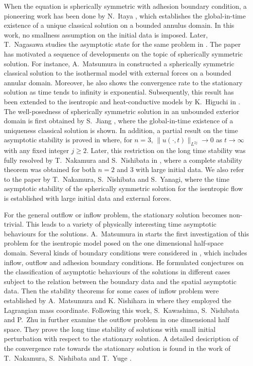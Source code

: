 \documentclass[a4paper,12pt,draft]{article}
\theoremstyle{remark}
\begin{document}
When the equation is spherically symmetric with adhesion boundary condition, a pioneering work has been done by N.~Itaya \cite{itaya85}, which establishes the global-in-time existence of a unique classical solution on a bounded annulus domain. In this work, no smallness assumption on the initial data is imposed. Later, T.~Nagasawa studies the asymptotic state for the same
problem in \cite{nagasawa}. The paper \cite{itaya85} has motivated a sequence of developments on the topic of spherically symmetric solution. For instance, A.~Matsumura in \cite{matsu92} constructed a spherically symmetric classical solution to the isothermal model with external forces on a bounded annular domain. Moreover, he also shows the convergence rate to the stationary solution as time tends to infinity is exponential. Subsequently, this result has been extended to the isentropic and heat-conductive models by K.~Higuchi in \cite{higuchi92}. The well-posedness of spherically symmetric solution in an unbounded exterior domain is first obtained by S.~Jiang \cite{jiang96}, where the global-in-time existence of a uniqueness classical solution is shown. In addition, a partial result on the time asymptotic stability is proved in \cite{jiang96} where, for $n=3$, $\|u(\cdot,t)\|_{L^{2j}}\to 0$ as $t\to\infty$ with any fixed integer $j\ge 2$. Later, this restriction on the long time stability was fully resolved by T.~Nakamura and S.~Nishibata in \cite{n-n08}, where a complete stability theorem was obtained for both $n=2$ and $3$ with large initial data. We also refer to the paper \cite{NNY} by T.~Nakamura, S.~Nishibata and S.~Yanagi, where the time asymptotic stability of the spherically symmetric solution for the isentropic flow is established with large initial data and external forces.

For the general outflow or inflow problem, the stationary solution becomes non-trivial. This leads to a variety of physically interesting time asymptotic behaviours for the solutions. A.~Matsumura in \cite{m2001} starts the first investigation of this problem for the isentropic model posed on the one dimensional half-space domain. Several kinds of boundary conditions were considered in \cite{m2001}, which includes inflow, outflow and adhesion boundary conditions. He formulated
conjectures on the classification of asymptotic behaviours of the solutions in different cases subject to the relation between the boundary data and the spatial asymptotic data. Then the stability theorems for some cases of inflow problem were established by A.~Matsumura and K. Nishihara in \cite{m-n01} where they employed the Lagrangian mass coordinate. Following this work, S.~Kawashima, S.~Nishibata and P.~Zhu in \cite{k-n-z03} further examine the outflow problem in one dimensional half space. They prove the long time stability of solutions with small initial perturbation with respect to the stationary solution. A detailed desicription of the convergence rate towards the stationary
solution is found in the work of T.~Nakamura, S.~Nishibata and T.~Yuge \cite{NNY}.
\end{document}
